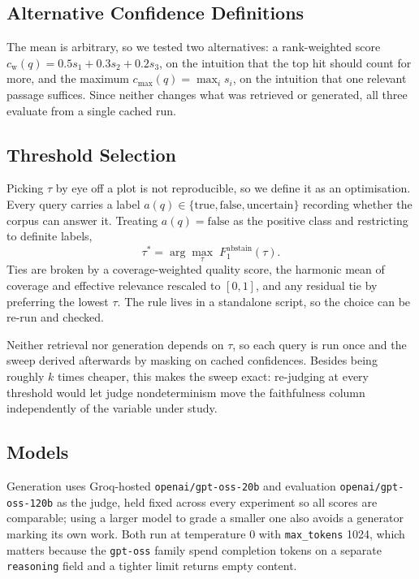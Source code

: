 \documentclass[conference]{IEEEtran}
\begin{document}
\subsection{Alternative Confidence Definitions}
\label{sec:variants}

The mean is arbitrary, so we tested two alternatives: a rank-weighted score $c_{\text{w}}(q) = 0.5 s_1 + 0.3 s_2 + 0.2 s_3$, on the intuition that the top hit should count for more, and the maximum $c_{\max}(q) = \max_i s_i$, on the intuition that one relevant passage suffices. Since neither changes what was retrieved or generated, all three evaluate from a single cached run.

\subsection{Threshold Selection}
\label{sec:threshold-selection}

Picking $\tau$ by eye off a plot is not reproducible, so we define it as an optimisation. Every query carries a label $a(q) \in \{\text{true}, \text{false}, \text{uncertain}\}$ recording whether the corpus can answer it. Treating $a(q) = \text{false}$ as the positive class and restricting to definite labels,
\begin{equation}
\tau^\ast = \arg\max_\tau \; F_1^{\text{abstain}}(\tau).
\end{equation}
Ties are broken by a coverage-weighted quality score, the harmonic mean of coverage and effective relevance rescaled to $[0,1]$, and any residual tie by preferring the lowest $\tau$. The rule lives in a standalone script, so the choice can be re-run and checked.

Neither retrieval nor generation depends on $\tau$, so each query is run once and the sweep derived afterwards by masking on cached confidences. Besides being roughly $k$ times cheaper, this makes the sweep exact: re-judging at every threshold would let judge nondeterminism move the faithfulness column independently of the variable under study.

\subsection{Models}

Generation uses Groq-hosted \texttt{openai/gpt-oss-20b} and evaluation \texttt{openai/gpt-oss-120b} as the judge, held fixed across every experiment so all scores are comparable; using a larger model to grade a smaller one also avoids a generator marking its own work. Both run at temperature 0 with \texttt{max\_tokens} 1024, which matters because the \texttt{gpt-oss} family spend completion tokens on a separate \texttt{reasoning} field and a tighter limit returns empty content.
\end{document}

